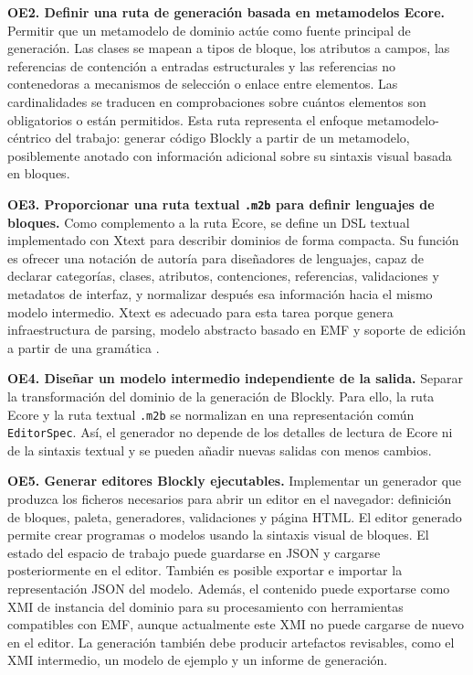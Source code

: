 \medskip
\noindent\textbf{OE2. Definir una ruta de generación basada en metamodelos
Ecore.} Permitir que un metamodelo de dominio actúe como fuente principal de
generación. Las clases se mapean a tipos de bloque, los atributos a campos, las
referencias de contención a entradas estructurales y las referencias no
contenedoras a mecanismos de selección o enlace entre elementos.
Las cardinalidades se traducen en comprobaciones sobre cuántos elementos son
obligatorios o están permitidos. Esta ruta representa el enfoque
metamodelo-céntrico del trabajo: generar código Blockly a partir de un
metamodelo, posiblemente anotado con información adicional sobre su sintaxis
visual basada en bloques.

\medskip
\noindent\textbf{OE3. Proporcionar una ruta textual \texttt{.m2b} para definir
lenguajes de bloques.} Como complemento a la ruta Ecore, se define un DSL
textual implementado con Xtext para describir dominios de forma compacta. Su
función es ofrecer una notación de autoría para diseñadores de lenguajes, capaz
de declarar categorías, clases, atributos, contenciones, referencias,
validaciones y metadatos de interfaz, y normalizar después esa información hacia
el mismo modelo intermedio. Xtext es adecuado para esta tarea porque genera
infraestructura de parsing, modelo abstracto basado en EMF y soporte de edición
a partir de una gramática
\cite{xtextProject,bettini2013xtext}.

\medskip
\noindent\textbf{OE4. Diseñar un modelo intermedio independiente de la salida.}
Separar la transformación del dominio de la generación de Blockly. Para ello, la
ruta Ecore y la ruta textual \texttt{.m2b} se normalizan en una representación
común \texttt{EditorSpec}. Así, el generador no depende de los detalles de
lectura de Ecore ni de la sintaxis textual y se pueden añadir nuevas salidas con
menos cambios.

\medskip
\noindent\textbf{OE5. Generar editores Blockly ejecutables.} Implementar un
generador que produzca los ficheros necesarios para abrir un editor en el
navegador: definición de bloques, paleta, generadores, validaciones y página
HTML. El editor generado permite crear programas o modelos usando la
sintaxis visual de bloques. El estado del espacio de trabajo puede guardarse en JSON y
cargarse posteriormente en el editor. También es posible exportar e importar la
representación JSON del modelo. Además, el contenido puede exportarse como XMI
de instancia del dominio para su procesamiento con herramientas compatibles con
EMF, aunque actualmente este XMI no puede cargarse de nuevo en el editor. La
generación también debe producir artefactos revisables, como el XMI intermedio,
un modelo de ejemplo y un informe de generación.

